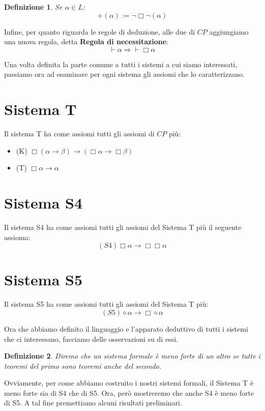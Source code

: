 \documentclass[a4paper, 12pt]{article}
\newtheorem{definition}{Definizione}
\begin{document}
\begin{definition}
Se $\alpha \in L$:
$$\diamond (\alpha) := \neg \Box \neg (\alpha)$$
\end{definition}

Infine, per quanto riguarda le regole di deduzione, alle due di $CP$ aggiungiamo
una nuova regola, detta \textbf{Regola di necessitazione}:
$$\vdash \alpha \Rightarrow \vdash \Box \alpha$$

Una volta definita la parte comune a tutti i sistemi a cui siamo interessati,
passiamo ora ad esaminare per ogni sistema gli assiomi che lo caratterizzano.

\section{Sistema T}
Il sistema T ha come assiomi tutti gli assiomi di $CP$ più:
\begin{itemize}
\item (K) $\Box (\alpha \rightarrow \beta) \rightarrow (\Box \alpha \rightarrow \Box \beta)$
\item (T) $\Box \alpha \rightarrow \alpha$
\end{itemize}

\section{Sistema S4}
Il sistema S4 ha come assiomi tutti gli assiomi del Sistema T più il seguente assioma:
$$(S4) \Box \alpha \rightarrow \Box \Box \alpha$$

\section{Sistema S5}
Il sistema S5 ha come assiomi tutti gli assiomi del Sistema T più:
$$(S5) \diamond \alpha \rightarrow \Box \diamond \alpha$$


Ora che abbiamo definito il linguaggio e l'apparato deduttivo di tutti i sistemi
che ci interessano, facciamo delle osservazioni su di essi.
\begin{definition}
Diremo che un sistema formale è meno forte di un altro se tutte i teoremi del primo
sono teoremi anche del secondo.
\end{definition}

Ovviamente, per come abbiamo costruito i nostri sistemi formali, il Sistema T è meno forte
sia di S4 che di S5.
Ora, però mostreremo che anche S4 è meno forte di S5. A tal fine premettiamo alcuni risultati
preliminari.
\end{document}
